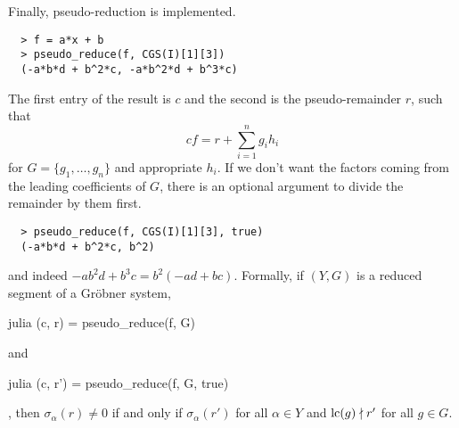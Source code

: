 Finally, pseudo-reduction is implemented.
\begin{verbatim}
  > f = a*x + b
  > pseudo_reduce(f, CGS(I)[1][3])
  (-a*b*d + b^2*c, -a*b^2*d + b^3*c)
\end{verbatim}
The first entry of the result is $c$ and the second is the pseudo-remainder $r$, such that
\[c f = r + \sum_{i=1}^{n} g_{i} h_{i}\]
for $G = \{g_{1}, \dots, g_{n}\}$ and appropriate $h_{i}$. If we don't want the factors coming from the leading coefficients of $G$, there is an optional argument to divide the remainder by them first.
\begin{verbatim}
  > pseudo_reduce(f, CGS(I)[1][3], true)
  (-a*b*d + b^2*c, b^2)
\end{verbatim}
and indeed $-a b^2 d + b^3 c = b^{2}(-ad + bc)$. Formally, if $(Y, G)$ is a reduced segment of a Gröbner system, \begin{mintinline}{julia} (c, r) = pseudo\_reduce(f, G) \end{mintinline} and \begin{mintinline}{julia} (c, r') = pseudo\_reduce(f, G, true) \end{mintinline}, then $\sigma_{\alpha}(r) \neq 0$ if and only if $\sigma_{\alpha}(r')$ for all $\alpha \in Y$ and $\operatorname{lc}(g) \nmid r'$ for all $g \in G$.
